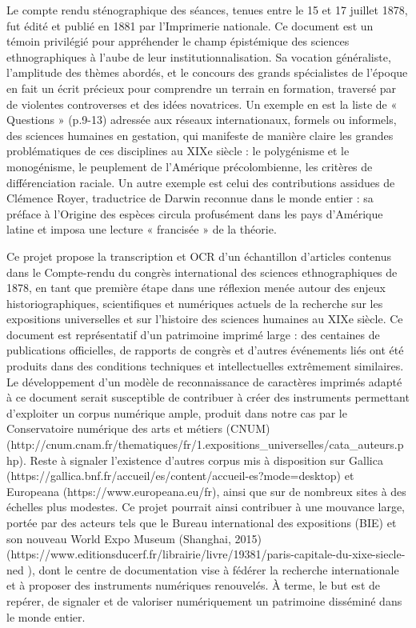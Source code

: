 \documentclass{article}
\begin{document}
	Le compte rendu sténographique des séances, tenues entre le 15 et 17 juillet 1878, fut édité et publié en 1881 par l’Imprimerie nationale. Ce document est un témoin privilégié pour appréhender le champ épistémique des sciences ethnographiques à l’aube de leur institutionnalisation. Sa vocation généraliste, l’amplitude des thèmes abordés, et le concours des grands spécialistes de l’époque en fait un écrit précieux pour comprendre un terrain en formation, traversé par de violentes controverses et des idées novatrices. Un exemple en est la liste de « Questions » (p.9-13) adressée aux réseaux internationaux, formels ou informels, des sciences humaines en gestation, qui manifeste de manière claire les grandes problématiques de ces disciplines au XIXe siècle : le polygénisme et le monogénisme, le peuplement de l’Amérique précolombienne, les critères de différenciation raciale. Un autre exemple est celui des contributions assidues de Clémence Royer, traductrice de Darwin reconnue dans le monde entier : sa préface à l’Origine des espèces circula profusément dans les pays d’Amérique latine et imposa une lecture « francisée » de la théorie. 
	
	Ce projet propose la transcription et OCR d’un échantillon d’articles contenus dans le Compte-rendu du congrès international des sciences ethnographiques de 1878, en tant que première étape dans une réflexion menée autour des enjeux historiographiques, scientifiques et numériques actuels de la recherche sur les expositions universelles et sur l’histoire des sciences humaines au XIXe siècle. Ce document est représentatif d’un patrimoine imprimé large : des centaines de publications officielles, de rapports de congrès et d’autres événements liés ont été produits dans des conditions techniques et intellectuelles extrêmement similaires. Le développement d’un modèle de reconnaissance de caractères imprimés adapté à ce document serait susceptible de contribuer à créer des instruments permettant d’exploiter un corpus numérique ample, produit dans notre cas par le Conservatoire numérique des arts et métiers (CNUM) (http://cnum.cnam.fr/thematiques/fr/1.expositions\_universelles/cata\_auteurs.php). Reste à signaler l’existence d’autres corpus mis à disposition sur Gallica (https://gallica.bnf.fr/accueil/es/content/accueil-es?mode=desktop) et Europeana (https://www.europeana.eu/fr), ainsi que sur de nombreux sites à des échelles plus modestes. Ce projet pourrait ainsi contribuer à une mouvance large, portée par des acteurs tels que le Bureau international des expositions (BIE) et son nouveau World Expo Museum (Shanghai, 2015) (https://www.editionsducerf.fr/librairie/livre/19381/paris-capitale-du-xixe-siecle-ned ), dont le centre de documentation vise à fédérer la recherche internationale et à proposer des instruments numériques renouvelés. À terme, le but est de repérer, de signaler et de valoriser numériquement un patrimoine disséminé dans le monde entier. 
	
\end{document}
